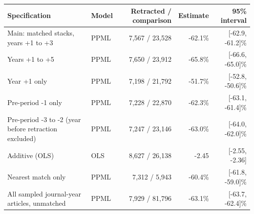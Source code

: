 
\begin{tabular}[t]{llrrr}
\toprule
Specification & Model & Retracted / comparison & Estimate & 95\% interval\\
\midrule
Main: matched stacks, years +1 to +3 & PPML & 7,567 / 23,528 & -62.1\% & {}[-62.9, -61.2]\%\\
Years +1 to +5 & PPML & 7,650 / 23,912 & -65.8\% & {}[-66.6, -65.0]\%\\
Year +1 only & PPML & 7,198 / 21,792 & -51.7\% & {}[-52.8, -50.6]\%\\
Pre-period -1 only & PPML & 7,228 / 22,870 & -62.3\% & {}[-63.1, -61.4]\%\\
Pre-period -3 to -2 (year before retraction excluded) & PPML & 7,247 / 23,146 & -63.0\% & {}[-64.0, -62.0]\%\\
Additive (OLS) & OLS & 8,627 / 26,138 & -2.45 & {}[-2.55, -2.36]\\
Nearest match only & PPML & 7,312 / 5,943 & -60.4\% & {}[-61.8, -59.0]\%\\
All sampled journal-year articles, unmatched & PPML & 7,929 / 81,796 & -63.1\% & {}[-63.7, -62.4]\%\\
\bottomrule
\end{tabular}

